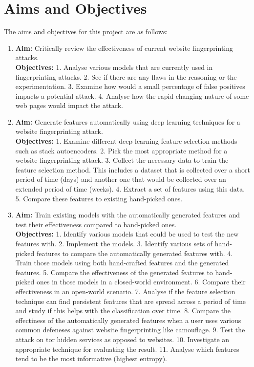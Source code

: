 \documentclass[10pt,a4paper]{article}
\begin{document}
\section{Aims and Objectives}
The aims and objectives for this project are as follows:
  \begin{enumerate}
    \item \label{aim1} \textbf{Aim:} Critically review the effectiveness of current website fingerprinting attacks.\\
    \textbf{Objectives:}
    1. Analyse various models that are currently used in fingerprinting attacks.
    2. See if there are any flaws in the reasoning or the experimentation.
    3. Examine how would a small percentage of false positives impacts a potential attack.
    4. Analyse how the rapid changing nature of some web pages would impact the attack.

    \item \textbf{Aim:} Generate features automatically using deep learning techniques for a website fingerprinting attack.\\
    \textbf{Objectives:}
    1. Examine different deep learning feature selection methods such as stack autoencoders.
    2. Pick the most appropriate method for a website fingerprinting attack.
    3. Collect the necessary data to train the feature selection method. This includes a dataset that is collected over a short period of time (days) and another one that would be collected over an extended period of time (weeks).
    4. Extract a set of features using this data.
    5. Compare these features to existing hand-picked ones.
\newpage
    \item \textbf{Aim:} Train existing models with the automatically generated features and test their effectiveness compared to hand-picked ones.\\
    \textbf{Objectives:}
    1. Identify various models that could be used to test the new features with.
    2. Implement the models.
    3. Identify various sets of hand-picked features to compare the automatically generated features with.
    4. Train those models using both hand-crafted features and the generated features.
    5. Compare the effectiveness of the generated features to hand-picked ones in those models in a closed-world environment.
    6. Compare their effectiveness in an open-world scenario.
    7. Analyse if the feature selection technique can find persistent features that are spread across a period of time and study if this helps with the classification over time.
    8. Compare the effectiness of the automatically generated features when a user uses various common defeneses against website fingerprinting like camouflage.
    9. Test the attack on tor hidden services as opposed to websites.
    10. Investigate an appropriate technique for evaluating the result.
    11. Analyse which features tend to be the most informative (highest entropy).

  \end{enumerate}
\end{document}
